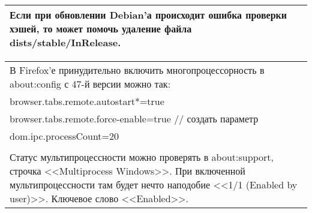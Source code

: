 \documentclass[14pt,openany]{book}
\begin{document}
\begin{center}
\begin{tabular}{|p{\textwidth}|}
\hline
Если при обновлении Debian'а происходит ошибка проверки хэшей, то может помочь удаление файла dists/stable/InRelease. \\
\hline
\end{tabular}
\begin{tabular}{|p{\textwidth}|}
\hline
В Firefox'е принудительно включить многопроцессорность в about:config с 47-й версии можно так: \\
browser.tabs.remote.autostart*=true \\
browser.tabs.remote.force-enable=true // создать параметр \\
dom.ipc.processCount=20 \\
 \\
Статус мультипроцессности можно проверять в about:support, строчка <<Multiprocess Windows>>. При включенной мультипроцессности там будет нечто наподобие <<1/1 (Enabled by user)>>. Ключевое слово <<Enabled>>. \\
\hline
\end{tabular}
\end{center}  
\end{document}
